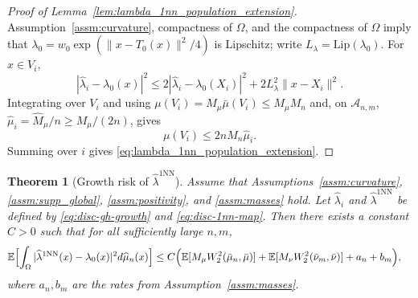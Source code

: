 \documentclass[11pt,reqno]{amsart}
\newtheorem{theorem}{Theorem}
\theoremstyle{definition}
\renewcommand{\hat}{\widehat}
\newcommand{\Ep}{\mathbb{E}}
\begin{document}
\begin{proof}[Proof of Lemma~\ref{lem:lambda_1nn_population_extension}]
Assumption~\ref{assm:curvature}, compactness of $\Omega$, and the compactness of $\Omega$ imply that $\lambda_0=w_0\exp(\|x-T_0(x)\|^2/4)$ is Lipschitz; write $L_\lambda=\mathrm{Lip}(\lambda_0)$. For $x\in V_i$,
\[
|\hat\lambda_i-\lambda_0(x)|^2
\le
2|\hat\lambda_i-\lambda_0(X_i)|^2
+
2L_\lambda^2\|x-X_i\|^2 .
\]
Integrating over $V_i$ and using $\mu(V_i)=M_\mu\bar\mu(V_i)\le M_\mu M_n$ and, on $\mathcal A_{n,m}$, $\hat\mu_i=\hat M_\mu/n\ge M_\mu/(2n)$, gives
\[
\mu(V_i)\le 2nM_n\hat\mu_i .
\]
Summing over $i$ gives \eqref{eq:lambda_1nn_population_extension}.
\end{proof}

\begin{theorem}[Growth risk of $\hat\lambda^{1\mathrm{NN}}$]
\label{thm:uot_complete_1nn_lambda_fitted}
Assume that Assumptions~\ref{assm:curvature}, \ref{assm:supp_global}, \ref{assm:positivity}, and \ref{assm:masses} hold.
Let $\hat\lambda_i$ and $\hat\lambda^{\mathrm{1NN}}$ be defined by \eqref{eq:disc-gh-growth} and \eqref{eq:disc-1nn-map}. Then there exists a constant $C>0$ such that for all sufficiently large $n,m$,
\begin{align}
\label{eq:uot_complete_1nn_lambda_fitted_expectation}
\begin{aligned}
    \Ep\Bigl[
        \int_\Omega |\hat\lambda^{\mathrm{1NN}}(x)-\lambda_0(x)|^2  d\hat\mu_n(x)
    \Bigr]
    &\le
    C
    \Bigl(
        \Ep[M_\mu W_2^2(\bar\mu_n,\bar\mu)]
        + \Ep[M_\nu W_2^2(\bar\nu_m,\bar\nu)]
        + a_n + b_m
    \Bigr),
\end{aligned}
\end{align}
where $a_n,b_m$ are the rates from Assumption~\ref{assm:masses}.
\end{theorem}
\end{document}
